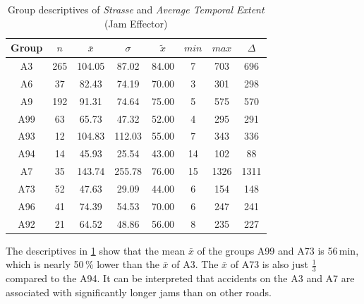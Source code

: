\begin{table}[ht]
	\tiny
	\centering
	\begin{tabular}{c|c|c|c|c|c|c|c}
		\toprule
		Group & $n$ & $\bar{x}$ & $\sigma$ & $\tilde{x}$ & $min$ & $max$ & $\Delta$ \\
		\midrule
		A3   & 265 & 104.05 & 87.02 & 84.00 & 7  & 703  & 696 \\ 
		A6   & 37  & 82.43  & 74.19  & 70.00 & 3  & 301  & 298 \\ 
		A9   & 192 & 91.31  & 74.64  & 75.00 & 5  & 575  & 570 \\  
		A99  & 63  & 65.73  & 47.32  & 52.00 & 4  & 295  & 291 \\ 
		A93  & 12  & 104.83 & 112.03 & 55.00 & 7  & 343  & 336 \\ 
		A94  & 14  & 45.93  & 25.54  & 43.00 & 14 & 102  & 88 \\ 
		A7   & 35  & 143.74 & 255.78 & 76.00 & 15 & 1326 & 1311 \\ 
		A73  & 52  & 47.63  & 29.09  & 44.00 & 6  & 154  & 148 \\ 
		A96  & 41  & 74.39  & 54.53  & 70.00 & 6  & 247  & 241 \\ 
		A92  & 21  & 64.52  & 48.86  & 56.00 & 8  & 235  & 227 \\ 
		\bottomrule
	  \end{tabular}
    \caption{Group descriptives of \textit{Strasse} and \textit{Average Temporal Extent} (Jam Effector)}
    \label{tbl:descriptives_baysis_effector_Strasse_TAvg}
\end{table}
The descriptives in \cref{tbl:descriptives_baysis_effector_Strasse_TAvg} show that the mean $\bar{x}$ of the groups A99 and A73 is 56\,min, which is nearly 50\,\% lower than the $\bar{x}$ of A3. The $\bar{x}$ of A73 is also just $\frac{1}{3}$ compared to the A94. It can be interpreted that accidents on the A3 and A7 are associated with significantly longer jams than on other roads.

